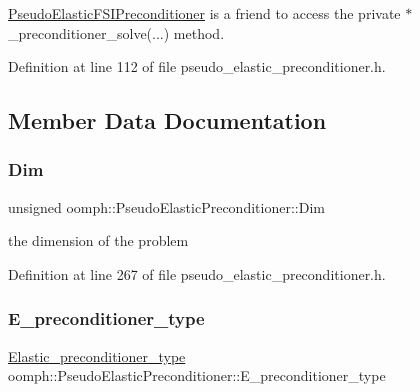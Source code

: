 \hyperlink{classoomph_1_1PseudoElasticFSIPreconditioner}{Pseudo\+Elastic\+F\+S\+I\+Preconditioner} is a friend to access the private $\ast$\+\_\+preconditioner\+\_\+solve(...) method. 



Definition at line 112 of file pseudo\+\_\+elastic\+\_\+preconditioner.\+h.



\subsection{Member Data Documentation}
\mbox{\label{classoomph_1_1PseudoElasticPreconditioner_aef0a56e6011e3a7f1c3a2ce171949077}} 
\subsubsection{\texorpdfstring{Dim}{Dim}}
{\footnotesize\ttfamily unsigned oomph\+::\+Pseudo\+Elastic\+Preconditioner\+::\+Dim\hspace{0.3cm}{\ttfamily [private]}}



the dimension of the problem 



Definition at line 267 of file pseudo\+\_\+elastic\+\_\+preconditioner.\+h.

\mbox{\label{classoomph_1_1PseudoElasticPreconditioner_abb84100d37f174e683b2d7a0dd688584}} 
\subsubsection{\texorpdfstring{E\+\_\+preconditioner\+\_\+type}{E\_preconditioner\_type}}
{\footnotesize\ttfamily \hyperlink{classoomph_1_1PseudoElasticPreconditioner_acde733e1a111a961d1e714add4e8015d}{Elastic\+\_\+preconditioner\+\_\+type} oomph\+::\+Pseudo\+Elastic\+Preconditioner\+::\+E\+\_\+preconditioner\+\_\+type\hspace{0.3cm}{\ttfamily [private]}}




